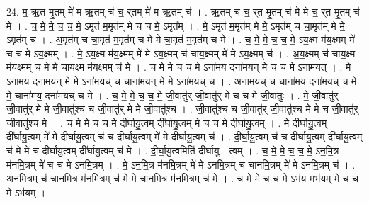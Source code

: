 \documentclass[17pt]{extarticle}
\begin{document}
24. म॒ ऋ॒त मृ॒तम् मे॑ म ऋ॒तम् च॑ च॒ र्‌तम् मे॑ म ऋ॒तम् च॑ । . ऋ॒तम् च॑ च॒ र्‌त मृ॒तम् च॑ मे मे च॒ र्‌त मृ॒तम् च॑ मे । . च॒ मे॒ मे॒ च॒ च॒ मे॒ ऽमृत॑ म॒मृत॑म् मे च च मे॒ ऽमृत᳚म् । . मे॒ ऽमृत॑ म॒मृत॑म् मे मे॒ ऽमृत॑म् च चा॒मृत॑म् मे मे॒ ऽमृत॑म् च । . अ॒मृत॑म् च चा॒मृत॑ म॒मृत॑म् च मे मे चा॒मृत॑ म॒मृत॑म् च मे । . च॒ मे॒ मे॒ च॒ च॒ मे॒ ऽय॒क्ष्म म॑य॒क्ष्मम् मे॑ च च मे ऽय॒क्ष्मम् । . मे॒ ऽय॒क्ष्म म॑य॒क्ष्मम् मे॑ मे ऽय॒क्ष्मम् च॑ चाय॒क्ष्मम् मे॑ मे ऽय॒क्ष्मम् च॑ । . अ॒य॒क्ष्मम् च॑ चाय॒क्ष्म म॑य॒क्ष्मम् च॑ मे मे चाय॒क्ष्म म॑य॒क्ष्मम् च॑ मे । . च॒ मे॒ मे॒ च॒ च॒ मे ऽना॑मय॒ दना॑मयन् मे च च॒ मे ऽना॑मयत् । . मे ऽना॑मय॒ दना॑मयन् मे॒ मे ऽना॑मयच् च॒ चाना॑मयन् मे॒ मे ऽना॑मयच् च । . अना॑मयच् च॒ चाना॑मय॒ दना॑मयच् च मे मे॒ चाना॑मय॒ दना॑मयच् च मे । . च॒ मे॒ मे॒ च॒ च॒ मे॒ जी॒वातु॑र् जी॒वातु॑र् मे च च मे जी॒वातुः॑ । . मे॒ जी॒वातु॑र् जी॒वातु॑र् मे मे जी॒वातु॑श्च च जी॒वातु॑र् मे मे जी॒वातु॑श्च । . जी॒वातु॑श्च च जी॒वातु॑र् जी॒वातु॑श्च मे मे च जी॒वातु॑र् जी॒वातु॑श्च मे । . च॒ मे॒ मे॒ च॒ च॒ मे॒ दी॒र्घा॒यु॒त्वम् दी᳚र्घायु॒त्वम् मे॑ च च मे दीर्घायु॒त्वम् । . मे॒ दी॒र्घा॒यु॒त्वम् दी᳚र्घायु॒त्वम् मे॑ मे दीर्घायु॒त्वम् च॑ च दीर्घायु॒त्वम् मे॑ मे दीर्घायु॒त्वम् च॑ । . दी॒र्घा॒यु॒त्वम् च॑ च दीर्घायु॒त्वम् दी᳚र्घायु॒त्वम् च॑ मे मे च दीर्घायु॒त्वम् दी᳚र्घायु॒त्वम् च॑ मे । . दी॒र्घा॒यु॒त्वमिति॑ दीर्घायु - त्वम् । . च॒ मे॒ मे॒ च॒ च॒ मे॒ ऽन॒मि॒त्र म॑नमि॒त्रम् मे॑ च च मे ऽनमि॒त्रम् । . मे॒ ऽन॒मि॒त्र म॑नमि॒त्रम् मे॑ मे ऽनमि॒त्रम् च॑ चानमि॒त्रम् मे॑ मे ऽनमि॒त्रम् च॑ । . अ॒न॒मि॒त्रम् च॑ चानमि॒त्र म॑नमि॒त्रम् च॑ मे मे चानमि॒त्र म॑नमि॒त्रम् च॑ मे । . च॒ मे॒ मे॒ च॒ च॒ मे ऽभ॑य॒ मभ॑यम् मे च च॒ मे ऽभ॑यम् । \newline
\end{document}
